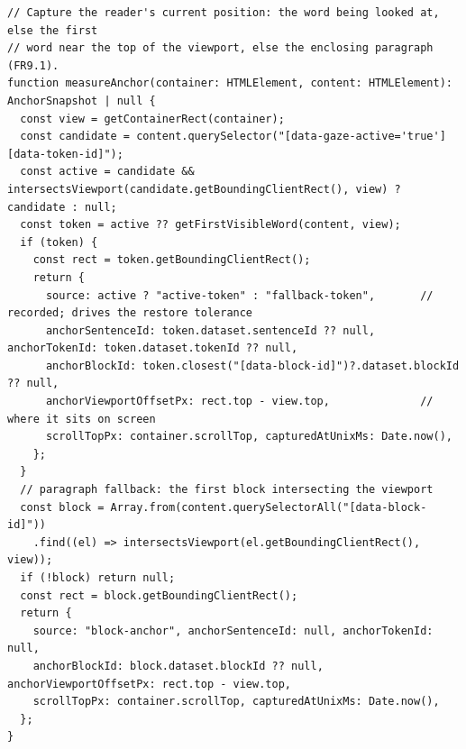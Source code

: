 \begin{listing}[htbp]
\begin{verbatim}
// Capture the reader's current position: the word being looked at, else the first
// word near the top of the viewport, else the enclosing paragraph (FR9.1).
function measureAnchor(container: HTMLElement, content: HTMLElement): AnchorSnapshot | null {
  const view = getContainerRect(container);
  const candidate = content.querySelector("[data-gaze-active='true'][data-token-id]");
  const active = candidate && intersectsViewport(candidate.getBoundingClientRect(), view) ? candidate : null;
  const token = active ?? getFirstVisibleWord(content, view);
  if (token) {
    const rect = token.getBoundingClientRect();
    return {
      source: active ? "active-token" : "fallback-token",       // recorded; drives the restore tolerance
      anchorSentenceId: token.dataset.sentenceId ?? null, anchorTokenId: token.dataset.tokenId ?? null,
      anchorBlockId: token.closest("[data-block-id]")?.dataset.blockId ?? null,
      anchorViewportOffsetPx: rect.top - view.top,              // where it sits on screen
      scrollTopPx: container.scrollTop, capturedAtUnixMs: Date.now(),
    };
  }
  // paragraph fallback: the first block intersecting the viewport
  const block = Array.from(content.querySelectorAll("[data-block-id]"))
    .find((el) => intersectsViewport(el.getBoundingClientRect(), view));
  if (!block) return null;
  const rect = block.getBoundingClientRect();
  return {
    source: "block-anchor", anchorSentenceId: null, anchorTokenId: null,
    anchorBlockId: block.dataset.blockId ?? null, anchorViewportOffsetPx: rect.top - view.top,
    scrollTopPx: container.scrollTop, capturedAtUnixMs: Date.now(),
  };
}
\end{verbatim}
\caption{Capturing the reading anchor (abbreviated from \texttt{usePreserveReadingContext.ts}): gazed-at word, then first visible word, then enclosing paragraph; records element identifier and viewport offset.}
\label{lst:impl-anchor-capture}
\end{listing}

